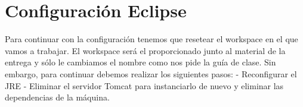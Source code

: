 \documentclass{scrartcl}
\begin{document}
\section{Configuración Eclipse}
Para continuar con la configuración tenemos que resetear el workspace en el que vamos a trabajar. El workspace será el proporcionado junto al material de la entrega y sólo le cambiamos el nombre como nos pide la guía de clase. Sin embargo, para continuar debemos realizar los siguientes pasos:
- Reconfigurar el JRE
- Eliminar el servidor Tomcat para instanciarlo de nuevo y eliminar las dependencias de la máquina.
	
\end{document}
